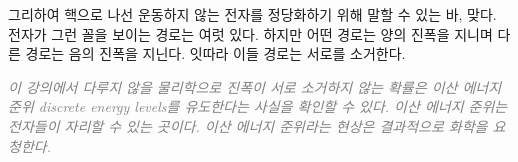 \documentclass[a4paper,chapter,kosection,atbegshi,hidelinks,itemph]{oblivoir}
\begin{document}
\newpage
그리하여 핵으로 나선 운동하지 않는 전자를 정당화하기 위해 말할 수 있는 바,
맞다. 전자가 그런 꼴을 보이는 경로는 여럿 있다. 하지만 어떤 경로는 양의 진폭을
지니며 다른 경로는 음의 진폭을 지닌다. 잇따라 이들 경로는 서로를 소거한다. 

\hfill

\hfill\parbox[t]{9cm}{\textcolor{gray}{\itshape 이 강의에서 다루지 않을 
물리학으로 진폭이 서로 소거하지 않는 확률은 이산 에너지 준위{\footnotesize
discrete energy levels}를 유도한다는 사실을 확인할 수 있다. 이산 에너지
준위는 전자들이 자리할 수 있는 곳이다. 이산 에너지 준위라는 현상은 결과적으로
화학을 요청한다.}}
\end{document}
